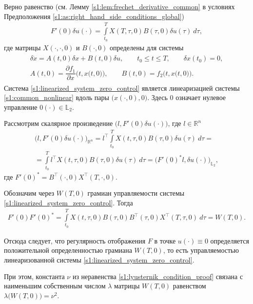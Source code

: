 \documentclass[../main.tex]{subfiles}
\begin{document}
Верно равенство (см. Лемму \ref{s1:lem:frechet_derivative_common} в условиях Предположения \ref{s1:as:right_hand_side_conditions_global})
\begin{gather*}
 F'(0) \delta u(\cdot) = \int\limits_{t_0}^{T} X(T, \tau, 0) B(\tau, 0) \delta u(\tau) \ d\tau,
\end{gather*}
где матрицы $X(\cdot, \cdot, 0)$ и $B(\cdot, 0)$ определены для системы
 \begin{gather}\label{s1:linearized_system_zero_control}
 \begin{gathered}
 		\delta \dot{x} = A(t, 0) \delta x + B(t, 0) \delta u, \qquad t_0 \leqslant t \leqslant T, \qquad \delta x(t_0) = 0, \\
 		A(t, 0) = \dfrac{\partial f_1}{\partial x} \Big(t,x\big(t,0\big)\Big), \qquad
 		B(t, 0) = f_2 \Big(t,x\big(t,0\big)\Big).
 \end{gathered}
\end{gather}
 Система \eqref{s1:linearized_system_zero_control} является линеаризацией системы \eqref{s1:common_nonlinear} вдоль пары $\Big(x(\cdot, 0), 0\Big) $.
Здесь $0$ означает нулевое управление $0(\cdot) \in \mathbb{L}_2$.

Рассмотрим скалярное произведение $ \Big(l, F'(0) \delta u(\cdot)\Big) $, где $ l \in \mathbb{R}^n$
\begin{gather*}
	\Big(l, F'(0) \delta u(\cdot)\Big)_{\mathbb{R}^n} =
	 l^{\top} \int\limits_{t_0}^{T} X(t, \tau, 0) B(\tau, 0) \delta u(\tau) \ d\tau = \\ = 
	 \int\limits_{t_0}^{T} l^{\top} X(t, \tau, 0) B(\tau, 0) \delta u(\tau) \ d\tau =
	 \Big(F'(0)^* l, \delta u(\cdot)\Big)_{\mathbb{L}_2},
\end{gather*}
где $ F'(0)^* = B^{\top} (\cdot, 0) X^{\top}(T, \cdot, 0)$.

Обозначим через $W(T,0) $ грамиан управляемости системы \eqref{s1:linearized_system_zero_control}.
Тогда 
\begin{gather}\label{s1:self_adjoint_with_derivative}
 F'(0) F'(0)^* = \int\limits_{t_0}^{T} X(t, \tau, 0) B(\tau, 0) B^{\top} (\tau, 0) X^{\top}(T, \tau, 0) \ d\tau= W(T,0).
\end{gather}

Отсюда следует, что регулярность отображения $F$ в точке $u(\cdot) \equiv 0$ определяется положительной определенностью грамиана $W(T,0) $, то есть управляемостью линеаризованной системы \eqref{s1:linearized_system_zero_control}. 

При этом, константа $\nu$ из неравенства \eqref{s1:lyusternik_condition_proof} связана с наименьшим собственным числом $\lambda$ матрицы $W(T,0) $ равенством $\lambda\big(W(T,0)\big) = \nu^2$.
 
\end{document}
